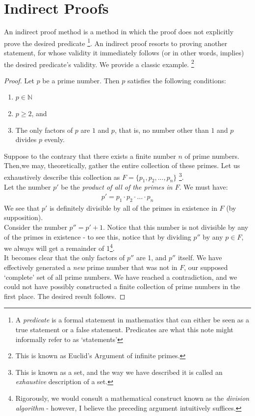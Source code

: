 \chapter{Indirect Proofs}
An indirect proof method is a method in which the proof does not explicitly prove the desired predicate \footnote{A \emph{predicate} is a formal statement in mathematics that can either be seen as a true statement or a false statement. Predicates are what this note might informally refer to as `statements'}. An indirect proof resorts to proving another statement, for whose validity it immediately follows (or in other words, implies) the desired predicate's validity. We provide a classic example. \footnote{This is known as Euclid's Argument of infinite primes.} \\

\noindent {}
\begin{proof}
  Let $p$ be a prime number. Then $p$ satisfies the following conditions:
    \begin{enumerate}
      \item $p \in \mathbb{N}$
      \item $p \geq 2$, and
      \item The only factors of $p$ are $1$ and $p$, that is, no number other than $1$ and $p$ divides $p$ evenly.
    \end{enumerate}
  Suppose to the contrary that there exists a finite number $n$ of prime numbers. \\
  Then,we may, theoretically, gather the entire collection of these primes. Let us exhaustively describe this collection as $F = \{p_1, p_2, ..., p_n\}$ \footnote{This is known as a set, and the way we have described it is called an \emph{exhaustive} description of a set.}. \\
  Let the number $p\prime$ be the \emph{product of all of the primes in $F$}. We must have:
  \begin{align*}
    p\prime = p_1 \cdot p_2 \cdot ... \cdot p_n
  \end{align*}
  We see that $p'$ is definitely divisible by all of the primes in existence in $F$ (by supposition). \\
  Consider the number $p \dprime = p \prime + 1$. Notice that this number is not divisible by any of the primes in existence - to see this, notice that by dividing $p \dprime $ by any $p \in F$, we always will get a remainder of 1\footnote{Rigorously, we would consult a mathematical construct known as the \emph{division algorithm} - however, I believe the preceding argument intuitively suffices.}.\\

  It becomes clear that the only factors of $p \dprime$ are 1, and $p \dprime$ itself. We have effectively generated a \emph{new} prime number that was not in $F$, our supposed `complete' set of all prime numbers. We have reached a contradiction, and we could not have possibly constructed a finite collection of prime numbers in the first place. The desired result follows.	\end{proof}

